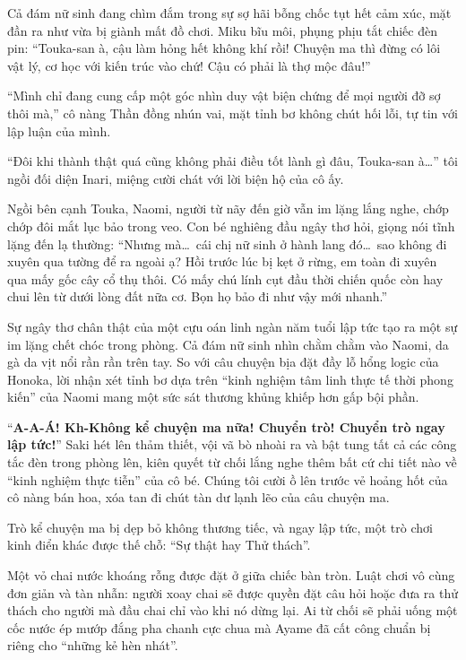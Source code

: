 \documentclass[../main.tex]{subfiles}
\begin{document}
Cả đám nữ sinh đang chìm đắm trong sự sợ hãi bỗng chốc tụt hết cảm xúc, mặt đần ra như vừa bị giành mất đồ chơi. Miku bĩu môi, phụng phịu tắt chiếc đèn pin: ``Touka-san à, cậu làm hỏng hết không khí rồi! Chuyện ma thì đừng có lôi vật lý, cơ học với kiến trúc vào chứ! Cậu có phải là thợ mộc đâu!''

``Mình chỉ đang cung cấp một góc nhìn duy vật biện chứng để mọi người đỡ sợ thôi mà,'' cô nàng Thần đồng nhún vai, mặt tỉnh bơ không chút hối lỗi, tự tin với lập luận của mình.

``Đôi khi thành thật quá cũng không phải điều tốt lành gì đâu, Touka-san à\dots'' tôi ngồi đối diện Inari, miệng cười chát với lời biện hộ của cô ấy.

Ngồi bên cạnh Touka, Naomi, người từ nãy đến giờ vẫn im lặng lắng nghe, chớp chớp đôi mắt lục bảo trong veo. Con bé nghiêng đầu ngây thơ hỏi, giọng nói tĩnh lặng đến lạ thường: ``Nhưng mà\dots\ cái chị nữ sinh ở hành lang đó\dots\ sao không đi xuyên qua tường để ra ngoài ạ? Hồi trước lúc bị kẹt ở rừng, em toàn đi xuyên qua mấy gốc cây cổ thụ thôi. Có mấy chú lính cụt đầu thời chiến quốc còn hay chui lên từ dưới lòng đất nữa cơ. Bọn họ bảo đi như vậy mới nhanh.''

Sự ngây thơ chân thật của một cựu oán linh ngàn năm tuổi lập tức tạo ra một sự im lặng chết chóc trong phòng. Cả đám nữ sinh nhìn chằm chằm vào Naomi, da gà da vịt nổi rần rần trên tay. So với câu chuyện bịa đặt đầy lỗ hổng logic của Honoka, lời nhận xét tỉnh bơ dựa trên ``kinh nghiệm tâm linh thực tế thời phong kiến'' của Naomi mang một sức sát thương khủng khiếp hơn gấp bội phần.

``\textbf{A-A-Á! Kh-Không kể chuyện ma nữa! Chuyển trò! Chuyển trò ngay lập tức!}'' Saki hét lên thảm thiết, vội vã bò nhoài ra và bật tung tất cả các công tắc đèn trong phòng lên, kiên quyết từ chối lắng nghe thêm bất cứ chi tiết nào về ``kinh nghiệm thực tiễn'' của cô bé. Chúng tôi cười ồ lên trước vẻ hoảng hốt của cô nàng bán hoa, xóa tan đi chút tàn dư lạnh lẽo của câu chuyện ma.

\ct

Trò kể chuyện ma bị dẹp bỏ không thương tiếc, và ngay lập tức, một trò chơi kinh điển khác được thế chỗ: ``Sự thật hay Thử thách''.

Một vỏ chai nước khoáng rỗng được đặt ở giữa chiếc bàn tròn. Luật chơi vô cùng đơn giản và tàn nhẫn: người xoay chai sẽ được quyền đặt câu hỏi hoặc đưa ra thử thách cho người mà đầu chai chỉ vào khi nó dừng lại. Ai từ chối sẽ phải uống một cốc nước ép mướp đắng pha chanh cực chua mà Ayame đã cất công chuẩn bị riêng cho ``những kẻ hèn nhát''.
\end{document}
